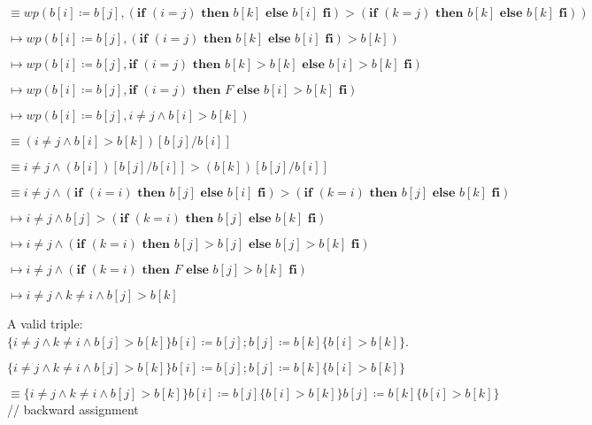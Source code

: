 \documentclass{article}
\begin{document}
\qquad \qquad $ \equiv wp(b[i] \coloneqq b[j], (\textbf{if } (i=j) \textbf{ then } b[k] \textbf{ else } b[i] \textbf{ fi}) > (\textbf{if } (k=j) \textbf{ then } b[k] \textbf{ else } b[k] \textbf{ fi}))$

\qquad \qquad $ \mapsto wp(b[i] \coloneqq b[j], (\textbf{if } (i=j) \textbf{ then } b[k] \textbf{ else } b[i] \textbf{ fi}) > b[k])$

\qquad \qquad $ \mapsto wp(b[i] \coloneqq b[j], \textbf{if } (i=j) \textbf{ then } b[k]>b[k] \textbf{ else } b[i]>b[k] \textbf{ fi})$

\qquad \qquad $ \mapsto wp(b[i] \coloneqq b[j], \textbf{if } (i=j) \textbf{ then } F \textbf{ else } b[i]>b[k] \textbf{ fi})$

\qquad \qquad $ \mapsto wp(b[i] \coloneqq b[j], i \neq j \wedge b[i]>b[k])$

\qquad \qquad $ \equiv (i \neq j \wedge b[i]>b[k])[b[j]/b[i]]$

\qquad \qquad $ \equiv i \neq j \wedge (b[i])[b[j]/b[i]]>(b[k])[b[j]/b[i]]$

\qquad \qquad $ \equiv i \neq j \wedge (\textbf{if } (i=i) \textbf{ then } b[j] \textbf{ else } b[i] \textbf{ fi})> (\textbf{if } (k=i) \textbf{ then } b[j] \textbf{ else } b[k] \textbf{ fi})$

\qquad \qquad $ \mapsto i \neq j \wedge b[j]> (\textbf{if } (k=i) \textbf{ then } b[j] \textbf{ else } b[k] \textbf{ fi})$

\qquad \qquad $ \mapsto i \neq j \wedge (\textbf{if } (k=i) \textbf{ then } b[j]> b[j] \textbf{ else } b[j]> b[k] \textbf{ fi})$

\qquad \qquad $ \mapsto i \neq j \wedge (\textbf{if } (k=i) \textbf{ then } F \textbf{ else } b[j]> b[k] \textbf{ fi})$

\qquad \qquad $ \mapsto i \neq j \wedge k \neq i \wedge b[j]> b[k]$

\vspace{10pt}

A valid triple: $ \{i \neq j \wedge k \neq i \wedge b[j]> b[k]\}b[i] \coloneqq b[j];b[j] \coloneqq b[k] \{b[i] > b[k]\}$.

\vspace{10pt}

$ \{i \neq j \wedge k \neq i \wedge b[j]> b[k]\}b[i] \coloneqq b[j];b[j] \coloneqq b[k] \{b[i] > b[k]\}$

\qquad \qquad $ \equiv \{i \neq j \wedge k \neq i \wedge b[j]> b[k]\}b[i] \coloneqq b[j]\{b[i] > b[k]\}b[j] \coloneqq b[k] \{b[i] > b[k]\}$
\qquad // backward assignment
\end{document}
